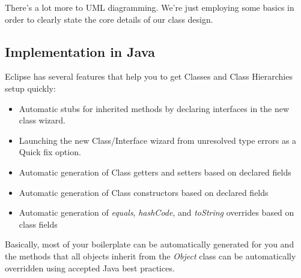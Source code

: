 \documentclass[]{tufte-handout}
\begin{document}
There's a lot more to UML diagramming. We're just employing some basics in order to clearly state the core details of our class design.

\subsection{Implementation in Java}

Eclipse has several features that help you to get Classes and Class Hierarchies setup quickly:
\begin{itemize}
\item Automatic stubs for inherited methods by declaring interfaces in the new class wizard.
\item Launching the new Class/Interface wizard from unresolved type errors as a Quick fix option.
\item Automatic generation of Class getters and setters based on declared fields
\item Automatic generation of Class constructors based on declared fields
\item Automatic generation of \textit{equals}, \textit{hashCode}, and \textit{toString} overrides based on class fields
\end{itemize}
Basically, most of your boilerplate can be automatically generated for you and the methods that all objects inherit from the \textit{Object} class can be automatically overridden using accepted Java best practices.  
\end{document}
